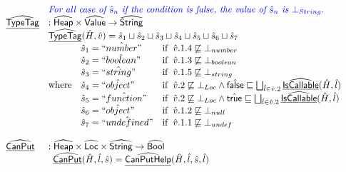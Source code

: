 \[\begin{array}{ll}
& {\color{blue} \textit{For all case of }\hat{s}_n\textit{ if the condition is false, the value of }\hat{s}_n\textit{ is }\bot_{String}.} \\
\widehat{\underline{\sf TypeTag}} & : \widehat{\mbox{\textsf{Heap}}} \times \widehat{\mbox{\textsf{Value}}} \rightarrow \widehat{\mbox{\textsf{String}}}\\
& \widehat{\underline{\sf TypeTag}}(\hat{H},\hat{v}) = \hat{s}_1\sqcup\hat{s}_2\sqcup\hat{s}_3\sqcup\hat{s}_4\sqcup\hat{s}_5\sqcup\hat{s}_6\sqcup\hat{s}_7 \\
& {\rm where}\begin{array}[t]{l}
  \begin{array}{ll}
  \hat{s}_1 = \hat{``number"} & {\rm if}\begin{array}[t]{l}\hat{v}.1.4\not\sqsubseteq\bot_{number}\end{array} \\
  \hat{s}_2 = \hat{``boolean"} & {\rm if}\begin{array}[t]{l}\hat{v}.1.3\not\sqsubseteq\bot_{boolean}\end{array} \\
  \hat{s}_3 = \hat{``string"} & {\rm if}\begin{array}[t]{l}\hat{v}.1.5\not\sqsubseteq\bot_{string}\end{array} \\
  \hat{s}_4 = \hat{``object"} & {\rm if}\begin{array}[t]{l}\hat{v}.2\not\sqsubseteq\bot_{Loc}\land\hat{\mbox{\textsf{false}}}\sqsubseteq\bigsqcup_{\hat{l}\in\hat{v}.2}\widehat{\underline{\sf IsCallable}}(\hat{H},\hat{l})\end{array} \\
  \hat{s}_5 = \hat{``function"} & {\rm if}\begin{array}[t]{l}\hat{v}.2\not\sqsubseteq\bot_{Loc}\land\hat{\mbox{\textsf{true}}}\sqsubseteq\bigsqcup_{\hat{l}\in\hat{v}.2}\widehat{\underline{\sf IsCallable}}(\hat{H},\hat{l})\end{array} \\
  \hat{s}_6 = \hat{``object"} & {\rm if}\begin{array}[t]{l}\hat{v}.1.2\not\sqsubseteq\bot_{null}\end{array} \\
  \hat{s}_7 = \hat{``undefined"} & {\rm if}\begin{array}[t]{l}\hat{v}.1.1\not\sqsubseteq\bot_{undef}\end{array} \\
  \end{array}\\
  \end{array}\\
\\


\widehat{\underline{\sf CanPut}} & : \widehat{\mbox{\textsf{Heap}}} \times \widehat{\mbox{\textsf{Loc}}} \times \widehat{\mbox{\textsf{String}}} \rightarrow \widehat{\mbox{\textsf{Bool}}}\\
&
\begin{array}{ll}
  \widehat{\underline{\sf CanPut}}(\hat{H},\hat{l},\hat{s}) = \widehat{\underline{\sf CanPutHelp}}(\hat{H},\hat{l},\hat{s},\hat{l}) & \\
\end{array}
\\\\


\end{array}\]
